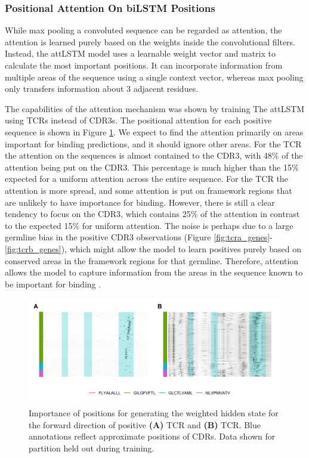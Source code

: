 \subsubsection{Positional Attention On biLSTM Positions}
While max pooling a convoluted sequence can be regarded as attention, the attention is learned purely based on the weights inside the convolutional filters. Instead, the attLSTM model uses a learnable weight vector and matrix to calculate the most important positions. It can incorporate information from multiple areas of the sequence using a single context vector, whereas max pooling only transfers information about 3 adjacent residues.

The capabilities of the attention mechanism was shown by training The attLSTM  using TCRs instead of CDR3s. The positional attention for each positive sequence is shown in Figure \ref{fig:att_tcrs}. We expect to find the attention primarily on areas important for binding predictions, and it should ignore other areas. For the TCR{\textalpha} the attention on the sequences is almost contained to the CDR3, with 48\% of the attention being put on the CDR3. This percentage is much higher than the 15\% expected for a uniform attention across the entire sequence. For the TCR{\textbeta} the attention is more spread, and some attention is put on framework regions that are unlikely to have importance for binding. However, there is still a clear tendency to focus on the CDR3, which contains 25\% of the attention in contrast to the expected 15\% for uniform attention. The noise is perhaps due to a large germline bias in the positive CDR3 observations (Figure \ref{fig:tcra_genes}-\ref{fig:tcrb_genes}), which might allow the model to learn positives purely based on conserved areas in the framework regions for that germline. Therefore, attention allows the model to capture information from the areas in the sequence known to be important for binding \cite{Tsuchiya2016TheLoops}.

\begin{figure}[H]
    \centering
    \includegraphics[width=\linewidth]{figures/attention_results/att_tcrs.png}
    \caption{Importance of positions for generating the weighted hidden state for the forward direction of positive \textbf{(A)} TCR{\textalpha} and \textbf{(B)} TCR{\textbeta}. Blue annotations reflect approximate positions of CDRs. Data shown for partition held out during training.}
    \label{fig:att_tcrs}
\end{figure}

